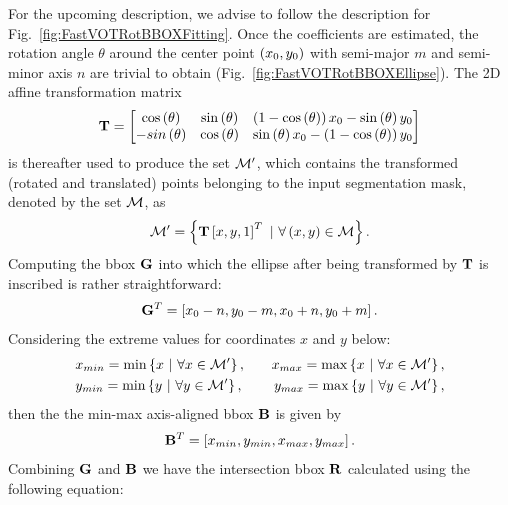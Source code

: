 For the upcoming description, we advise to follow the description for Fig.~\ref{fig:FastVOTRotBBOXFitting}. Once the coefficients are estimated, the rotation angle $\theta$ around the center point $\left( {x_0, y_0} \right)$ with semi-major $m$ and semi-minor axis $n$ are trivial to obtain (Fig.~\ref{fig:FastVOTRotBBOXEllipse}). The 2D affine transformation matrix
\begin{equation}
    \mathbf{T} =
    \begin{bmatrix}
        {\cos} \left( \theta \right) &
        {\sin} \left( \theta \right) &
        \left( {1 - {\cos} \left( \theta \right)} \right)x_0 - {\sin} \left( \theta \right) y_0 \\
        -{sin} \left( \theta \right) &
        {\cos} \left( \theta \right) &
        {\sin} \left( \theta \right) x_0 - \left( {1 - {\cos} \left( \theta \right)} \right) y_0
    \end{bmatrix}
\end{equation}
is thereafter used to produce the set $\mathcal{M'}$, which contains the transformed (rotated and translated) points belonging to the input segmentation mask, denoted by the set $\mathcal{M}$, as
\begin{equation}
    \mathcal{M'} =
    \left\{ {
        \mathbf{T}
        \left[ {x, y, 1} \right]^T
        \ | \
        \forall \left( {x, y} \right) \in \mathcal{M}
    } \right\}.
\end{equation}
Computing the \gls{bbox} $\mathbf{G}$ into which the ellipse after being transformed by $\mathbf{T}$ is inscribed is rather straightforward:
\begin{equation}
    {\mathbf{G}}^T = \left[ {x_0 - n, y_0 - m, x_0 + n, y_0 + m} \right].
\end{equation}
Considering the extreme values for coordinates $x$ and $y$ below:
\begin{equation}
    \begin{aligned}
         & x_{min} = \min \left\{ {x\ |\ \forall x \in \mathcal{M'}} \right\},
        \quad
         & x_{max} = \max \left\{ {x\ |\ \forall x \in \mathcal{M'}} \right\}, \\
         & y_{min} = \min \left\{ {y\ |\ \forall y \in \mathcal{M'}} \right\},
        \quad
         & y_{max} = \max \left\{ {y\ |\ \forall y \in \mathcal{M'}} \right\},
    \end{aligned}
\end{equation}
then the the min-max axis-aligned \gls{bbox} $\mathbf{B}$ is given by
\begin{equation}
    {\mathbf{B}}^T = \left[ {x_{min}, y_{min}, x_{max}, y_{max}} \right].
\end{equation}
Combining $\mathbf{G}$ and $\mathbf{B}$ we have the intersection \gls{bbox} $\mathbf{R}$ calculated using the following equation:
